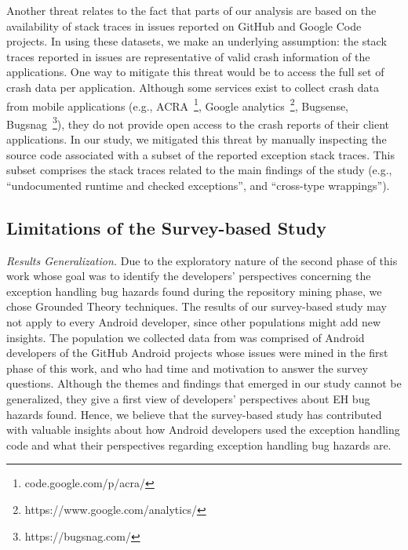 {Another threat relates to the fact that parts of our analysis
are based on the availability of stack traces in issues reported on GitHub and Google Code projects.
In using these datasets, we make an underlying assumption: the stack traces reported in issues are
representative of valid crash information of the applications.
One way to mitigate this threat would be to access the full
set of crash data per application. Although some services exist
to collect crash data from mobile applications (e.g., ACRA~\footnote{code.google.com/p/acra/},  Google analytics~\footnote{https://www.google.com/analytics/}, Bugsense, Bugsnag~\footnote{https://bugsnag.com/}),
they do not provide open access to the crash reports of their client applications.
In our study, we mitigated this threat by manually inspecting
the source code associated with a subset of the reported exception stack traces.
This subset comprises the stack traces related to the main findings
of the study (e.g., ``undocumented runtime and checked exceptions'',
and ``cross-type wrappings'').

\subsection{Limitations of the Survey-based Study}
\emph{Results Generalization.} Due to the exploratory nature of the second phase of this work whose
goal was to identify the developers' perspectives concerning the exception
handling bug hazards found during the repository mining
phase, we chose Grounded Theory techniques. The results of our
survey-based study may not apply to every Android developer, since other populations
might add new insights.  The population we collected data from was comprised
of Android developers of the GitHub
Android projects whose issues were mined in the first phase of this work, and who had
time and motivation to answer the survey questions.
Although the themes and findings that emerged in our study cannot
be generalized, they give a first view of developers' perspectives about
 EH bug hazards found. Hence, we believe that the survey-based study
has contributed with valuable insights about how Android developers
used the exception handling code and what their perspectives regarding
exception handling bug hazards are.


}
